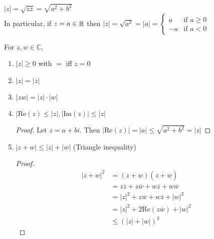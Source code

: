 \begin{definition}
	$|z|=\sqrt{z\overline{z}}=\sqrt{a^2+b^2}$\\
	In particular, if $z=a \in \mathbb{R} $ then $|z|=\sqrt{a^2}=|a|=
		\begin{cases}
			a  & \text{if } a\ge 0 \\
			-a & \text{if } a<0
		\end{cases}$
\end{definition}

\begin{theorem}
	For $z,w \in \mathbb{C}$,
	\begin{enumerate}
		\item $|z|\ge 0$ with $=$ iff $z=0$
		\item $|z|=|\overline{z}|$
		\item $|zw|=|z|\cdot |w|$
		\item $|\text{Re}(z)\le |z|, |\text{Im}(z)|\le |z|$
		      \begin{proof}
			      Let $z=a+bi$. Then $|\text{Re}(z)|=|a|\le \sqrt{a^2+b^2}=|z|$
		      \end{proof}
		\item $|z+w|\le |z|+|w|$ (Triangle inequality)
		      \begin{proof}
			      \begin{align*}
				      |z+w|^2 & =(z+w)(\overline{z+w})                                   \\
				              & =z\overline{z}+z\overline{w}+w\overline{z}+w\overline{w} \\
				              & =|z|^2+z\overline{w}+w\overline{z}+|w|^2                 \\
				              & = |z|^2+2\text{Re}(z\overline{w})+|w|^2                  \\
				              & \le (|z|+|w|)^2
			      \end{align*}
		      \end{proof}
	\end{enumerate}
\end{theorem}

